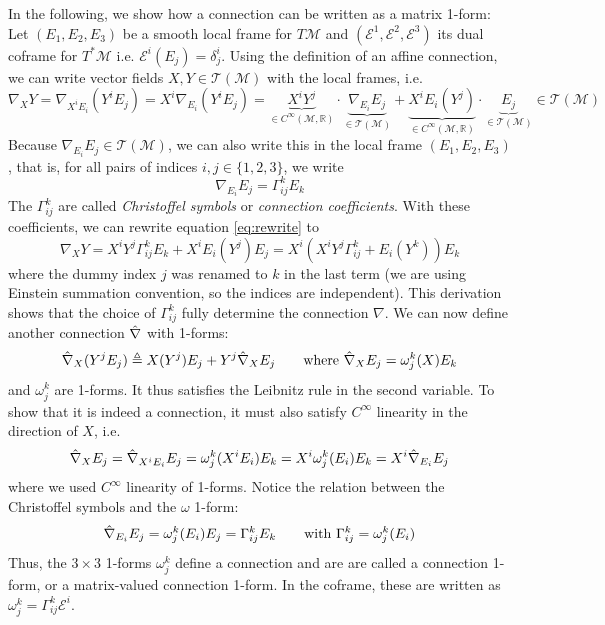 \documentclass[../thesis.tex]{subfiles}
\begin{document}
In the following, we show how a connection can be written as a matrix 1-form:
Let $(E_1, E_2, E_3)$ be a smooth local frame for $T\mathcal{M}$ and
$(\mathcal{E}^1, \mathcal{E}^2, \mathcal{E}^3)$ its dual coframe for
$T^*\mathcal{M}$ i.e. $\mathcal{E}^i(E_j)=\delta^i_j$.
Using the definition of an affine connection, we can write
vector fields $X,Y \in \mathcal{T}(\mathcal{M})$ with the local frames, i.e.
\begin{equation}\label{eq:rewrite}
  \nabla_XY = \nabla_{X^iE_i}(Y^iE_j) = X^i\nabla_{E_i}(Y^iE_j)
  = \underbrace{X^iY^j}_{\in C^{\infty}(\mathcal{M}, \mathbb{R})} \cdot \underbrace{\nabla_{E_i}E_j}_{\in \mathcal{T}(\mathcal{M})} + \underbrace{X^iE_i(Y^j)}_{\in C^{\infty}(\mathcal{M}, \mathbb{R})}\cdot \underbrace{E_j}_{\in \mathcal{T}(\mathcal{M})} \in \mathcal{T}(\mathcal{M})
\end{equation}
Because $\nabla_{E_i}E_j \in \mathcal{T}(\mathcal{M})$, we can also write this in the local frame $(E_1, E_2, E_3)$,
that is, for all pairs of indices $i,j \in \{1,2,3\}$, we write
$$\nabla_{E_i}E_j = \Gamma_{ij}^kE_k$$
The $\Gamma_{ij}^k$ are called \emph{Christoffel symbols} or \emph{connection coefficients}.
With these coefficients, we can rewrite equation \ref{eq:rewrite} to 
\begin{equation}
  \nabla_XY = X^iY^j \Gamma_{ij}^kE_k + X^iE_i(Y^j) E_j = X^i(X^iY^j\Gamma_{ij}^k + E_i(Y^k))E_k
\end{equation}
where the dummy index $j$ was renamed to $k$ in the last term (we are using Einstein summation convention, so the indices are independent).
This derivation shows that the choice of $\Gamma_{ij}^k$ fully determine the connection $\nabla$.
We can now define another connection $\Hat{\nabla}$ with 1-forms:
\begin{equation}
  \Hat{\nabla}_X (Y^jE_j) \triangleq X(Y^j)E_j + Y^j \Hat{\nabla}_X E_j \qquad \text{where } \Hat{\nabla}_XE_j = \omega_j^k(X)E_k
\end{equation}
and $\omega_j^k$ are 1-forms. It thus satisfies the Leibnitz rule in the second variable.
To show that it is indeed a connection, it must also satisfy $C^{\infty}$ linearity in the direction of $X$, i.e.
\begin{equation}
  \Hat{\nabla}_XE_j = \Hat{\nabla}_{X^iE_i}E_j = \omega_j^k(X^iE_i)E_k = X^i\omega_j^k(E_i)E_k = X^i \Hat{\nabla}_{E_i}E_j
\end{equation}
where we used $C^{\infty}$ linearity of 1-forms. Notice the relation between
the Christoffel symbols and the $\omega$ 1-form:
$$\Hat{\nabla}_{E_i}E_j = \omega_j^k(E_i)E_j = \Gamma_{ij}^kE_k \qquad \text{with }\Gamma_{ij}^k=\omega_j^k(E_i)$$
Thus, the $3\times3$ 1-forms $\omega_j^k$ define a connection and are
are called a connection 1-form, or a matrix-valued connection 1-form. In the coframe, these are written as $\omega_j^k = \Gamma_{ij}^k \mathcal{E}^i$.
\end{document}

